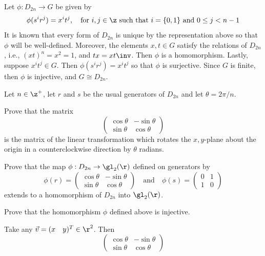 \begin{problems}
\begin{sol}
        Let $\phi : D_{2n} \to G$ be given by
        \[\phi(s^ir^j) = x^it^j, \quad \text{for $i, j \in \z$ such that $i = \{0, 1\}$ and $0 \leq j < n - 1$}\]
        It is known that every form of $D_{2n}$ is unique by the representation above so that $\phi$ will be well-defined. Moreover, the elements $x, t \in G$ satisfy the relations of $D_{2n}$, i.e., $(xt)^n = x^2 = 1$, and $tx = xt\inv$. Then $\phi$ is a homomorphism. Lastly, suppose $x^it^j \in G$. Then $\phi(s^ir^j) = x^it^j$ so that $\phi$ is surjective. Since $G$ is finite, then $\phi$ is injective, and $G \cong D_{2n}$.
    \end{sol}
    \item Let $n \in \z^+$, let $r$ and $s$ be the usual generators of $D_{2n}$ and let $\theta = 2\pi / n$.
    \begin{problems}
        \item Prove that the matrix 
        \[
        \begin{pmatrix}
        \cos \theta & -\sin \theta \\
        \sin \theta & \cos \theta
        \end{pmatrix}
        \]
        is the matrix of the linear transformation which rotates the $x,y$-plane about the origin in a counterclockwise direction by $\theta$ radians.
        \item Prove that the map $\phi : D_{2n} \to \gl_2(\r)$ defined on generators by
        \[
        \phi(r) = 
        \begin{pmatrix}
            \cos \theta & -\sin \theta \\
            \sin \theta & \cos \theta
        \end{pmatrix}
        \quad \text{and} \quad
        \phi(s) = 
        \begin{pmatrix}
            0 & 1 \\
            1 & 0
        \end{pmatrix}
        \]
        extends to a homomorphism of $D_{2n}$ into $\gl_2(\r)$.
        \item Prove that the homomorphism $\phi$ defined above is injective.
    \end{problems}
    \begin{solalph}
        \item Take any $\vec v = (x \quad y)^T \in \r^2$. Then
        \[
        \begin{pmatrix}
            \cos\theta & -\sin\theta \\
            \sin\theta & \cos\theta

\end{pmatrix}\]
\end{solalph}
\end{problems}
